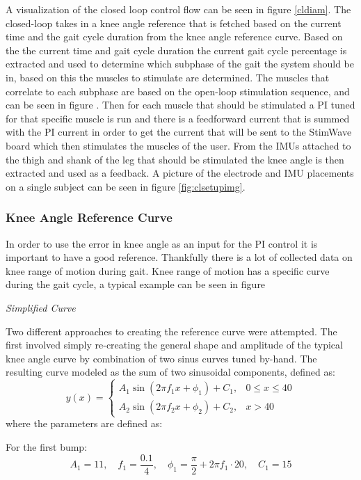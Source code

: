 A visualization of the closed loop control flow can be seen in figure \ref{cldiam}. The closed-loop takes in a knee angle reference that is fetched based on the current time and the gait cycle duration from the knee angle reference curve. Based on the the current time and gait cycle duration the current gait cycle percentage is extracted and used to determine which subphase of the gait the system should be in, based on this the muscles to stimulate are determined. The muscles that correlate to each subphase are based on the open-loop stimulation sequence, and can be seen in figure . Then for each muscle that should be stimulated a PI tuned for that specific muscle is run and there is a feedforward current that is summed with the PI current in order to get the current that will be sent to the StimWave board which then stimulates the muscles of the user. From the IMUs attached to the thigh and shank of the leg that should be stimulated the knee angle is then extracted and used as a feedback. A picture of the electrode and IMU placements on a single subject can be seen in figure \ref{fig:clsetupimg}.


\subsubsection{Knee Angle Reference Curve}
In order to use the error in knee angle as an input for the PI control it is important to have a good reference. Thankfully there is a lot of collected data on knee range of motion during gait. Knee range of motion has a specific curve during the gait cycle, a typical example can be seen in figure  
\newline 

\textit{Simplified Curve}

Two different approaches to creating the reference curve were attempted. The first involved simply re-creating the general shape and amplitude of the typical knee angle curve by combination of two sinus curves tuned by-hand. The resulting curve modeled as the sum of two sinusoidal components, defined as:
\[
y(x) =
\begin{cases}
A_1 \sin\left(2 \pi f_1 x + \phi_1\right) + C_1, & 0 \leq x \leq 40 \\
A_2 \sin\left(2 \pi f_2 x + \phi_2\right) + C_2, & x > 40
\end{cases}
\]
where the parameters are defined as:

For the first bump:
\[
A_1 = 11, \quad f_1 = \frac{0.1}{4}, \quad \phi_1 = \frac{\pi}{2} + 2\pi f_1 \cdot 20, \quad C_1 = 15
\]

